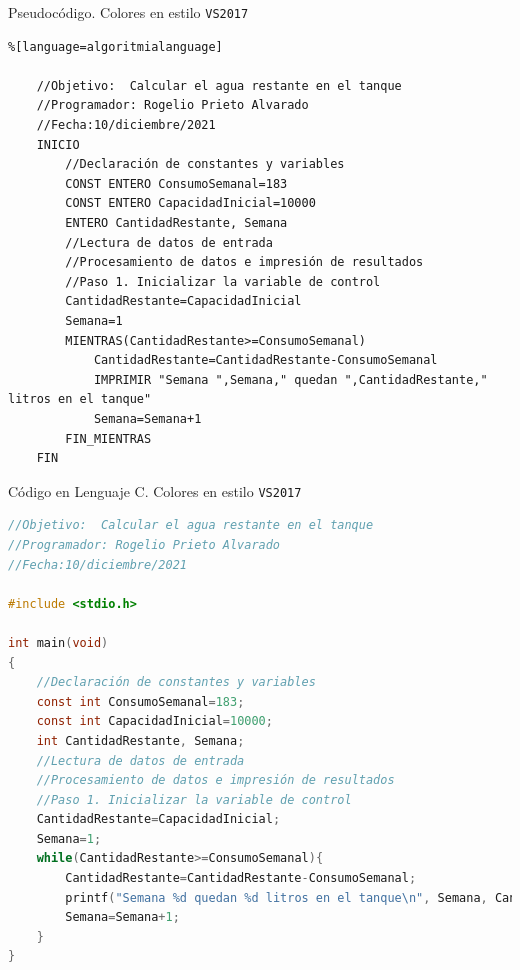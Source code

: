 \documentclass[spanish,11pt,twoside]{article}
\newcommand{\rocketbox}[1]{
	\awesomebox[uasblue]{2pt}{\faRocket}{uasblue}{#1}
}
\begin{document}


\vspace{120px}





Pseudocódigo. Colores en estilo \texttt{VS2017}
\begin{mdframed}[backgroundcolor=clr-background,topline=true,bottomline=true,leftline=false,rightline=false,innerleftmargin=\leftskip, innertopmargin=0pt]
\begin{lstlisting}%[language=algoritmialanguage]
	
	//Objetivo:  Calcular el agua restante en el tanque 
	//Programador: Rogelio Prieto Alvarado
	//Fecha:10/diciembre/2021
	INICIO
		//Declaración de constantes y variables
		CONST ENTERO ConsumoSemanal=183
		CONST ENTERO CapacidadInicial=10000
		ENTERO CantidadRestante, Semana
		//Lectura de datos de entrada
		//Procesamiento de datos e impresión de resultados
		//Paso 1. Inicializar la variable de control
		CantidadRestante=CapacidadInicial
		Semana=1
		MIENTRAS(CantidadRestante>=ConsumoSemanal)
			CantidadRestante=CantidadRestante-ConsumoSemanal
			IMPRIMIR "Semana ",Semana," quedan ",CantidadRestante," litros en el tanque"
			Semana=Semana+1
		FIN_MIENTRAS
	FIN	
\end{lstlisting}
\end{mdframed}

\vspace{20pt}
Código en Lenguaje C. Colores en estilo \texttt{VS2017}
\begin{mdframed}[backgroundcolor=clr-background,topline=true,bottomline=true,leftline=false,rightline=false,innerleftmargin=\leftskip, innertopmargin=0pt]

	\begin{lstlisting}[language=C]
//Objetivo:  Calcular el agua restante en el tanque 
//Programador: Rogelio Prieto Alvarado
//Fecha:10/diciembre/2021

#include <stdio.h>

int main(void)
{
	//Declaración de constantes y variables
	const int ConsumoSemanal=183;
	const int CapacidadInicial=10000;
	int CantidadRestante, Semana;
	//Lectura de datos de entrada
	//Procesamiento de datos e impresión de resultados
	//Paso 1. Inicializar la variable de control
	CantidadRestante=CapacidadInicial;
	Semana=1;
	while(CantidadRestante>=ConsumoSemanal){
		CantidadRestante=CantidadRestante-ConsumoSemanal;
		printf("Semana %d quedan %d litros en el tanque\n", Semana, CantidadRestante);
		Semana=Semana+1;
	}
} \end{lstlisting}
\end{mdframed}
\end{document}
